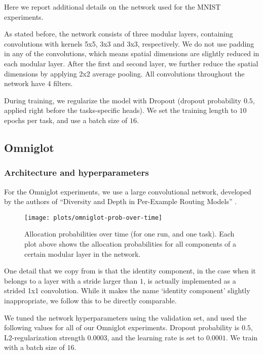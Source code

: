 \documentclass[conference]{IEEEtran}
\begin{document}
Here we report additional details on the network used for the MNIST experiments. 

As stated before, the network consists of three modular layers, containing convolutions with kernels 5x5, 3x3 and 3x3, respectively. We do not use padding in any of the convolutions, which means spatial dimensions are slightly reduced in each modular layer. After the first and second layer, we further reduce the spatial dimensions by applying 2x2 average pooling. All convolutions throughout the network have $4$ filters.

During training, we regularize the model with Dropout (dropout probability $0.5$, applied right before the tasks-specific heads). We set the training length to $10$ epochs per task, and use a batch size of $16$.

\subsection{Omniglot}

\subsubsection{Architecture and hyperparameters}\label{appendix:omniglot_mt_network}

For the Omniglot experiments, we use a large convolutional network, developed by the authors of “Diversity and Depth in Per-Example Routing Models” \cite{Diversity&Depth-ICLR-2019}.

\begin{figure*}[t]
\begin{center}
\texttt{[image: plots/omniglot-prob-over-time]}
\end{center}
\caption{Allocation probabilities over time (for one run, and one task). Each plot above shows the allocation probabilities for all components of a certain modular layer in the network.}\label{fig:omniglot_probs_over_time}
\end{figure*}

One detail that we copy from \cite{Diversity&Depth-ICLR-2019} is that the identity component, in the case when it belongs to a  layer with a stride larger than $1$, is actually implemented as a strided 1x1 convolution. While it makes the name `identity component' slightly inappropriate, we follow this to be directly comparable.

We tuned the network hyperparameters using the validation set, and used the following values for all of our Omniglot experiments. Dropout probability is $0.5$, L2-regularization strength $0.0003$, and the learning rate is set to $0.0001$. We train with a batch size of $16$.
\end{document}
